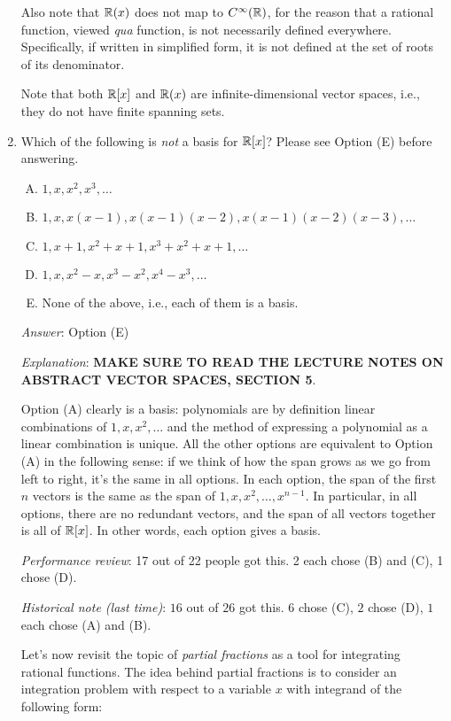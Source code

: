 \documentclass[10pt]{amsart}
\begin{document}
\begin{enumerate}
  Also note that $\mathbb{R}(x)$ does not map to $C^\infty(\mathbb{R})$, for the
  reason that a rational function, viewed {\em qua} function, is not
  necessarily defined everywhere. Specifically, if written in
  simplified form, it is not defined at the set of roots of its
  denominator.

  Note that both $\mathbb{R}[x]$ and $\mathbb{R}(x)$ are infinite-dimensional vector
  spaces, i.e., they do not have finite spanning sets.

\item Which of the following is {\em not} a basis for $\mathbb{R}[x]$? Please
  see Option (E) before answering.

  \begin{enumerate}[(A)]
  \item $1,x,x^2,x^3,\dots$
  \item $1,x,x(x - 1),x(x - 1)(x - 2),x(x-1)(x-2)(x-3),\dots$
  \item $1,x + 1, x^2 + x + 1, x^3 + x^2 + x + 1, \dots$
  \item $1,x,x^2 - x, x^3 - x^2, x^4 - x^3,\dots$
  \item None of the above, i.e., each of them is a basis.
  \end{enumerate}

  {\em Answer}: Option (E)

  {\em Explanation}: {\bf MAKE SURE TO READ THE LECTURE NOTES ON ABSTRACT VECTOR SPACES, SECTION 5}.

  Option (A) clearly is a basis: polynomials are by definition linear
  combinations of $1,x,x^2,\dots$ and the method of expressing a
  polynomial as a linear combination is unique. All the other options
  are equivalent to Option (A) in the following sense: if we think of
  how the span grows as we go from left to right, it's the same in all
  options. In each option, the span of the first $n$ vectors is the
  same as the span of $1,x,x^2,\dots,x^{n-1}$. In particular, in all
  options, there are no redundant vectors, and the span of all vectors
  together is all of $\mathbb{R}[x]$. In other words, each option gives a
  basis.

  {\em Performance review}: 17 out of 22 people got this. 2 each chose
  (B) and (C), 1 chose (D).

  {\em Historical note (last time)}: $16$ out of $26$ got this. $6$ chose (C),
  $2$ chose (D), $1$ each chose (A) and (B).

  \vspace{0.6in}

  Let's now revisit the topic of {\em partial fractions} as a tool for
  integrating rational functions. The idea behind partial fractions is
  to consider an integration problem with respect to a variable
  $x$ with integrand of the following form:


\end{enumerate}
\end{document}
